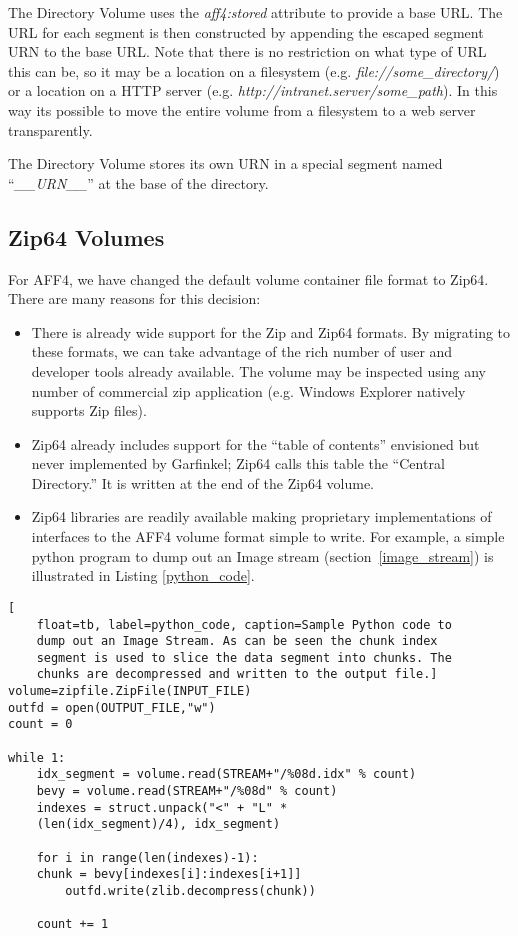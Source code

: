 \documentclass[10pt, conference]{IEEEtran}
\begin{document}
The Directory Volume uses the {\em aff4:stored} attribute to provide a
base URL. The URL for each segment is then constructed by appending
the escaped segment URN to the base URL. Note that there is no
restriction on what type of URL this can be, so it may be a location
on a filesystem (e.g. {\em file://some\_directory/}) or a location on a
HTTP server (e.g. {\em http://intranet.server/some\_path}). In this
way its possible to move the entire volume from a filesystem to a web
server transparently.

The Directory Volume stores its own URN in a special segment named
``{\em \_\_URN\_\_}'' at the base of the directory.

\subsection{Zip64 Volumes}
For AFF4, we have changed the default volume container file format to
Zip64\cite{zip-format}. There are many reasons for this decision:

\begin{itemize}
\item There is already wide support for the Zip and Zip64 formats. By
  migrating to these formats, we can take advantage of the rich number
  of user and developer tools already available. The volume may be
  inspected using any number of commercial zip application
  (e.g. Windows Explorer natively supports Zip files).
 
\item Zip64 already includes support for the ``table of contents''
  envisioned but never implemented by Garfinkel; Zip64 calls this
  table the ``Central Directory.'' It is written at the end of the
  Zip64 volume.

\item Zip64 libraries are readily available making proprietary implementations of
interfaces to the AFF4 volume format simple to write. For example, a
simple python program to dump out an Image stream
(section~\ref{image_stream}) is illustrated in Listing
\ref{python_code}.

\end{itemize}

\begin{lstlisting}[
	float=tb, label=python_code, caption=Sample Python code to
	dump out an Image Stream. As can be seen the chunk index
	segment is used to slice the data segment into chunks. The
	chunks are decompressed and written to the output file.]
volume=zipfile.ZipFile(INPUT_FILE)
outfd = open(OUTPUT_FILE,"w")
count = 0

while 1:
    idx_segment = volume.read(STREAM+"/%08d.idx" % count)
    bevy = volume.read(STREAM+"/%08d" % count)
    indexes = struct.unpack("<" + "L" * 
	(len(idx_segment)/4), idx_segment)

    for i in range(len(indexes)-1):
	chunk = bevy[indexes[i]:indexes[i+1]]
        outfd.write(zlib.decompress(chunk))

    count += 1
\end{lstlisting}
\end{document}
